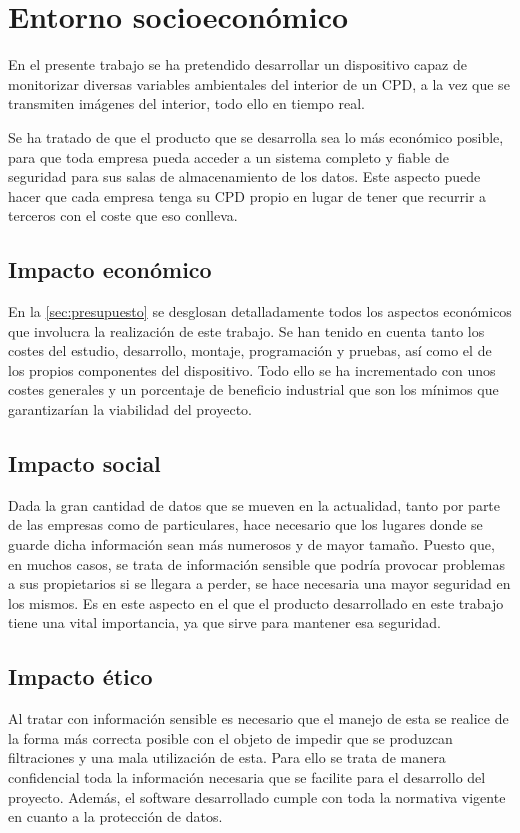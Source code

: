 \chapter{Entorno socioeconómico}\label{ch:entornoSocioEconomico}
En el presente trabajo se ha pretendido desarrollar un dispositivo capaz de monitorizar diversas variables ambientales del interior de un CPD, a la vez que se transmiten imágenes del interior, todo ello en tiempo real.

Se ha tratado de que el producto que se desarrolla sea lo más económico posible, para que toda empresa pueda acceder a un sistema completo y fiable de seguridad para sus salas de almacenamiento de los datos. Este aspecto puede hacer que cada empresa tenga su CPD propio en lugar de tener que recurrir a terceros con el coste que eso conlleva.

\section{Impacto económico}\label{sec:impacto-económico}
En la \autoref{sec:presupuesto} se desglosan detalladamente todos los aspectos económicos que involucra la realización de este trabajo. Se han tenido en cuenta tanto los costes del estudio, desarrollo, montaje, programación y pruebas, así como el de los propios componentes del dispositivo. Todo ello se ha incrementado con unos costes generales y un porcentaje de beneficio industrial que son los mínimos que garantizarían la viabilidad del proyecto.

\section{Impacto social}\label{sec:impacto-social}
Dada la gran cantidad de datos que se mueven en la actualidad, tanto por parte de las empresas como de particulares, hace necesario que los lugares donde se guarde dicha información sean más numerosos y de mayor tamaño. Puesto que, en muchos casos, se trata de información sensible que podría provocar problemas a sus propietarios si se llegara a perder, se hace necesaria una mayor seguridad en los mismos. Es en este aspecto en el que el producto desarrollado en este trabajo tiene una vital importancia, ya que sirve para mantener esa seguridad.

\section{Impacto ético}\label{sec:impacto-ético}
Al tratar con información sensible es necesario que el manejo de esta se realice de la forma más correcta posible con el objeto de impedir que se produzcan filtraciones y una mala utilización de esta. Para ello se trata de manera confidencial toda la información necesaria que se facilite para el desarrollo del proyecto. Además, el software desarrollado cumple con toda la normativa vigente en cuanto a la protección de datos.

